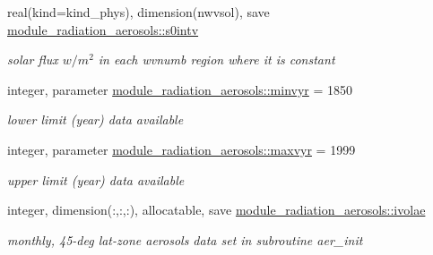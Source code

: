 \begin{DoxyCompactItemize}
\mbox{\label{group__module__radiation__aerosols_gaed8bb8a8bc26d72a6c3d31ed4430941f}} 
real(kind=kind\+\_\+phys), dimension(nwvsol), save \hyperlink{group__module__radiation__aerosols_gaed8bb8a8bc26d72a6c3d31ed4430941f}{module\+\_\+radiation\+\_\+aerosols\+::s0intv}
\begin{DoxyCompactList}\small\item\em solar flux $w/m^2$ in each wvnumb region where it is constant \end{DoxyCompactList}\item 
\mbox{\label{group__module__radiation__aerosols_gab37644d8cc2c222af700b86db91f05e7}} 
integer, parameter \hyperlink{group__module__radiation__aerosols_gab37644d8cc2c222af700b86db91f05e7}{module\+\_\+radiation\+\_\+aerosols\+::minvyr} = 1850
\begin{DoxyCompactList}\small\item\em lower limit (year) data available \end{DoxyCompactList}\item 
\mbox{\label{group__module__radiation__aerosols_gad856a3d564ff84043219626759673f27}} 
integer, parameter \hyperlink{group__module__radiation__aerosols_gad856a3d564ff84043219626759673f27}{module\+\_\+radiation\+\_\+aerosols\+::maxvyr} = 1999
\begin{DoxyCompactList}\small\item\em upper limit (year) data available \end{DoxyCompactList}\item 
\mbox{\label{group__module__radiation__aerosols_gab016f51c81a1157ee234dc82f8f114ee}} 
integer, dimension(\+:,\+:,\+:), allocatable, save \hyperlink{group__module__radiation__aerosols_gab016f51c81a1157ee234dc82f8f114ee}{module\+\_\+radiation\+\_\+aerosols\+::ivolae}
\begin{DoxyCompactList}\small\item\em monthly, 45-\/deg lat-\/zone aerosols data set in subroutine \textquotesingle{}aer\+\_\+init\textquotesingle{} \end{DoxyCompactList}\item 
\mbox{\label{group__module__radiation__aerosols_gaf224f7d7991e3d48aeaa4d221da50f41}} 

\end{DoxyCompactItemize}
